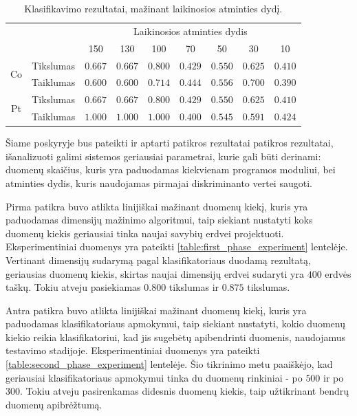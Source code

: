 \documentclass[]{vgtuef}
\begin{document}
\begin{table}
	\centering
	\caption{Klasifikavimo rezultatai, mažinant laikinosios atminties dydį.}
	\label{table:memory_linear_experiment}
	\begin{tabular}{|c|c|c|c|c|c|c|c|c|} \hline
			& & \multicolumn{7}{c|}{Laikinosios atminties dydis} \\ \cline{3-9}
						&	& 150 & 130 & 100 & 70 & 50 & 30 & 10\\ \hline
		\multirow{2}{*}{Co}
		& Tikslumas	& $0.667$ & $0.667$ & $\mathbf{0.800}$ & $0.429$ & $0.550$ & $0.625$ & $0.410$ \\ \cline{2-9}
		& Taiklumas  &	$0.600$ & $0.600$ & $\mathbf{0.714}$ & $0.444$ & $0.556$ & $0.700$ & $0.390$ \\ \hline
		\multirow{2}{*}{Pt}
		& Tikslumas	& $0.667$ & $0.667$ & $\mathbf{0.800}$ & $0.429$ & $0.550$ & $0.625$ & $0.410$ \\ \cline{2-9}
		& Taiklumas  &	$1.000$ & $1.000$ & $\mathbf{1.000}$ & $0.400$ & $0.545$ & $0.591$ & $0.424$ \\ \hline
	\end{tabular}
\end{table}

Šiame poskyryje bus pateikti ir aptarti patikros rezultatai patikros rezultatai, išanalizuoti galimi sistemos geriausiai parametrai, kurie gali būti derinami: duomenų skaičius, kuris yra paduodamas kiekvienam programos moduliui, bei atminties dydis, kuris naudojamas pirmajai diskriminanto vertei saugoti.

Pirma patikra buvo atlikta linijiškai mažinant duomenų kiekį, kuris yra paduodamas dimensijų mažinimo algoritmui, taip siekiant nustatyti koks duomenų kiekis geriausiai tinka naujai savybių erdvei projektuoti. Eksperimentiniai duomenys yra pateikti \ref{table:first_phase_experiment} lentelėje. Vertinant dimensijų sudarymą pagal klasifikatoriaus duodamą rezultatą, geriausias duomenų kiekis, skirtas naujai dimensijų erdvei sudaryti yra $400$ erdvės taškų. Tokiu atveju pasiekiamas $0.800$ tikslumas ir $0.875$ tikslumas. 

Antra patikra buvo atlikta linijiškai mažinant duomenų kiekį, kuris yra paduodamas klasifikatoriaus apmokymui, taip siekiant nustatyti, kokio duomenų kiekio reikia klasifikatoriui, kad jis sugebėtų apibendrinti duomenis, naudojamus testavimo stadijoje. Eksperimentiniai duomenys yra pateikti \ref{table:second_phase_experiment} lentelėje. Šio tikrinimo metu paaiškėjo, kad geriausiai klasifikatoriaus apmokymui tinka du duomenų rinkiniai - po $500$ ir po $300$. Tokiu atveju pasirenkamas didesnis duomenų kiekis, taip užtikrinant bendrų duomenų apibrėžtumą.
\end{document}
